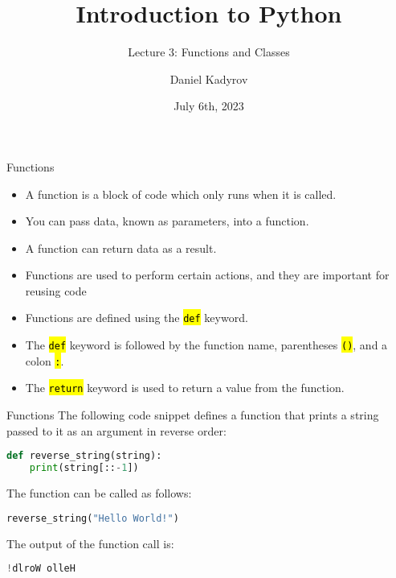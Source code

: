 \documentclass[
    aspectratio=169, 
    usepdftitle=false, 
    xcolor={dvipsnames},
    hyperref={
        colorlinks,
        linkcolor=black,
        urlcolor=blue}
    ]{beamer}
\title[Introduction to Python]{Introduction to Python}
\subtitle{Lecture 3: Functions and Classes}
\author{Daniel Kadyrov}
\date{July 6th, 2023}
\let\OldTexttt\texttt
\renewcommand{\texttt}[1]{\OldTexttt{\hl{#1}}}%
\begin{document}
\begin{frame}
    \titlepage
\end{frame}

\begin{frame}{Functions}
    \begin{itemize}
        \item A function is a block of code which only runs when it is called.
        \item You can pass data, known as parameters, into a function.
        \item A function can return data as a result.
        \item Functions are used to perform certain actions, and they are important for reusing code
        \item Functions are defined using the \texttt{def} keyword.
        \item The \texttt{def} keyword is followed by the function name, parentheses \texttt{()}, and a colon \texttt{:}.
        \item The \texttt{return} keyword is used to return a value from the function.
    \end{itemize}
\end{frame}

\begin{frame}[fragile]{Functions}
    The following code snippet defines a function that prints a string passed to it as an argument in reverse order: 

    \begin{lstlisting}[language=Python]
def reverse_string(string):
    print(string[::-1])
    \end{lstlisting}

    The function can be called as follows:

    \begin{lstlisting}[language=Python]
reverse_string("Hello World!")
    \end{lstlisting}

    The output of the function call is:

    \begin{lstlisting}[language=Python]
!dlroW olleH
    \end{lstlisting}
\end{frame}
\end{document}
